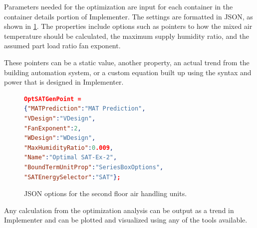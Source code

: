 Parameters needed for the optimization are input for each container in
the container details portion of Implementer. The settings are formatted
in JSON, as shown in \figref{} \ref{fig:JSONOptions}. The properties
include options such as pointers to how the mixed air temperature
should be calculated, the maximum supply humidity ratio, and the
assumed part load ratio fan exponent. 

These pointers can be a static value, another property, an actual
trend from the building automation system, or a custom equation built up
using the syntax and power that is designed in Implementer.

\begin{figure}
\centering
\begin{lstlisting}[language=json]
OptSATGenPoint = 
{"MATPrediction":"MAT Prediction",
"VDesign":"VDesign",
"FanExponent":2,
"WDesign":"WDesign",
"MaxHumidityRatio":0.009,
"Name":"Optimal SAT-Ex-2",
"BoundTermUnitProp":"SeriesBoxOptions",
"SATEnergySelector":"SAT"};
\end{lstlisting}
\label{fig:JSONOptions}
\caption{JSON options for the second floor air handling units. }
\end{figure}

Any calculation  from the optimization analysis can be output as a trend
in Implementer and can be plotted and visualized using any of the tools
available. 






